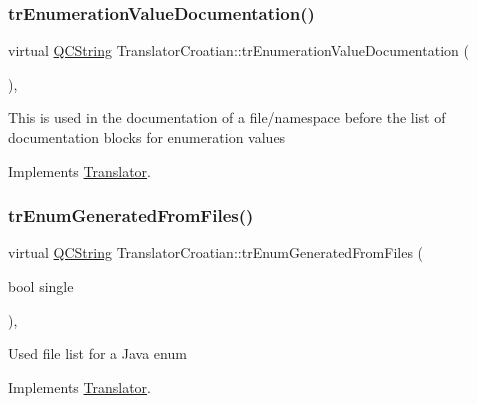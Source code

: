 \mbox{\label{class_translator_croatian_a570d826f15efb5bda206077852bb439b}} 
\subsubsection{\texorpdfstring{trEnumerationValueDocumentation()}{trEnumerationValueDocumentation()}}
{\footnotesize\ttfamily virtual \mbox{\hyperlink{class_q_c_string}{Q\+C\+String}} Translator\+Croatian\+::tr\+Enumeration\+Value\+Documentation (\begin{DoxyParamCaption}{ }\end{DoxyParamCaption})\hspace{0.3cm}{\ttfamily [inline]}, {\ttfamily [virtual]}}

This is used in the documentation of a file/namespace before the list of documentation blocks for enumeration values 

Implements \mbox{\hyperlink{class_translator}{Translator}}.

\mbox{\label{class_translator_croatian_a48747300f884a8e745a45eebb4b70a20}} 
\subsubsection{\texorpdfstring{trEnumGeneratedFromFiles()}{trEnumGeneratedFromFiles()}}
{\footnotesize\ttfamily virtual \mbox{\hyperlink{class_q_c_string}{Q\+C\+String}} Translator\+Croatian\+::tr\+Enum\+Generated\+From\+Files (\begin{DoxyParamCaption}\item[{bool}]{single }\end{DoxyParamCaption})\hspace{0.3cm}{\ttfamily [inline]}, {\ttfamily [virtual]}}

Used file list for a Java enum 

Implements \mbox{\hyperlink{class_translator}{Translator}}.

\mbox{\label{class_translator_croatian_a60cdeaebbcd43e0042ccd1daf99b50fc}} 
